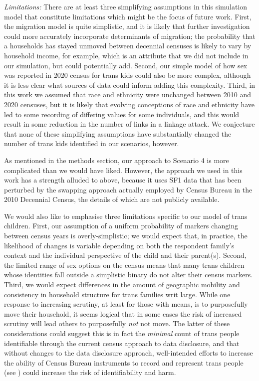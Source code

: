 \documentclass{jpc} %
\theoremstyle{plain}\newtheorem{satz}[thm]{Satz} %
\begin{document}
\emph{Limitations:}
There are at least three simplifying assumptions in this simulation model that constitute limitations which might be the focus of future work.  First, the migration model is quite simplistic, and it is likely that further investigation could more accurately incorporate determinants of migration; the probability that a households has stayed unmoved between decennial censuses is likely to vary by household income, for example, which is an attribute that we did not include in our simulation, but could potentially add.
Second, our simple model of how sex was reported in 2020 census for trans kids could also be more complex, although it is less clear what sources of data could inform adding this complexity. Third, in this work we assumed that race and ethnicity were unchanged between 2010 and 2020 censuses, but it is likely that evolving conceptions of race and ethnicity have led to some recording of differing values for some individuals, and this would result in some reduction in the number of links in a linkage attack.  We conjecture that none of these simplifying assumptions have substantially changed the number of trans kids identified in our scenarios, however.

As mentioned in the methods section, our approach to Scenario 4 is more complicated than we would have liked.  However, the approach we used in this work has a strength alluded to above, because it uses SF1 data that has been perturbed by the swapping approach actually employed by Census Bureau in the 2010 Decennial Census, the details of which are not publicly available.

We would also like to emphasise three limitations specific to our model of trans children. First, our assumption of a uniform probability of markers changing between census years is overly-simplistic; we would expect that, in practice, the likelihood of changes is variable depending on both the respondent family's context and the individual perspective of the child and their parent(s). Second, the limited range of sex options on the census means that many trans children whose identities fall outside a simplistic binary do not alter their census markers. Third, we would expect differences in the amount of geographic mobility and consistency in household structure for trans families writ large. While one response to increasing scrutiny, at least for those with means, is to purposefully move their household, it seems logical that in some cases the risk of increased scrutiny will lead others to purposefully \emph{not} not move. The latter of these considerations could  suggest this is in fact the \textit{minimal} count of trans people identifiable through the current census approach to data disclosure, and that without changes to the data disclosure approach, well-intended efforts to increase the ability of Census Bureau instruments to record and represent trans people (see \cite{whfactsheet}) could  increase the risk of identifiability and harm.
\end{document}
